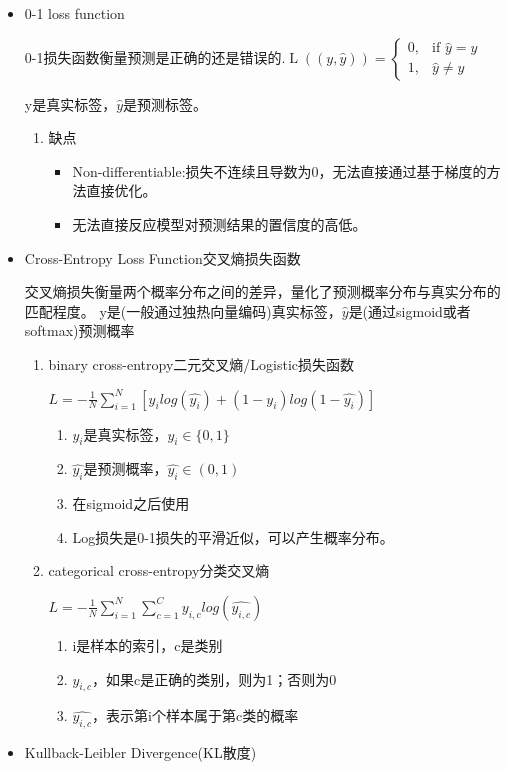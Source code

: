\documentclass[UTF8]{ctexart}
\begin{document}
\begin{itemize}
    \item 0-1 loss function
    
    0-1损失函数衡量预测是正确的还是错误的.$\operatorname{L}((y,\hat{y})) = \begin{cases} 0, & \text{if } \hat{y} = y \\ 1, & \hat{y}\neq y \end{cases}$

    y是真实标签，$\hat{y}$是预测标签。
    
    \begin{enumerate}
        \item 缺点
        \begin{itemize}
            \item Non-differentiable:损失不连续且导数为0，无法直接通过基于梯度的方法直接优化。
            \item 无法直接反应模型对预测结果的置信度的高低。
        \end{itemize}
    \end{enumerate}

    \item Cross-Entropy Loss Function交叉熵损失函数
    
    交叉熵损失衡量两个概率分布之间的差异，量化了预测概率分布与真实分布的匹配程度。
    y是(一般通过独热向量编码)真实标签，$\hat{y}$是(通过sigmoid或者softmax)预测概率
    \begin{enumerate}
        \item binary cross-entropy二元交叉熵/Logistic损失函数
        
        $L=-\frac{1}{N}\sum\limits_{i=1}^{N}[y_{i}log(\hat{y_{i}})+(1-y_{i})log(1-\hat{y_{i}})]$
        \begin{enumerate}
            \item $y_{i}是真实标签，y_{i}\in \{0,1\}$
            \item $\hat{y_{i}}是预测概率，\hat{y_{i}}\in (0,1)$
            \item 在sigmoid之后使用
            \item Log损失是0-1损失的平滑近似，可以产生概率分布。
        \end{enumerate}
        \item categorical cross-entropy分类交叉熵
        
        $L=-\frac{1}{N}\sum\limits_{i=1}^{N}\sum\limits_{c=1}^{C}y_{i,c}log(\hat{y_{i,c}})$
        \begin{enumerate}
            \item i是样本的索引，c是类别
            \item $y_{i,c}$，如果c是正确的类别，则为1；否则为0
            \item $\hat{y_{i,c}}$，表示第i个样本属于第c类的概率
        \end{enumerate}
    \end{enumerate}
    \item Kullback-Leibler Divergence(KL散度)
    

\end{itemize}
\end{document}
